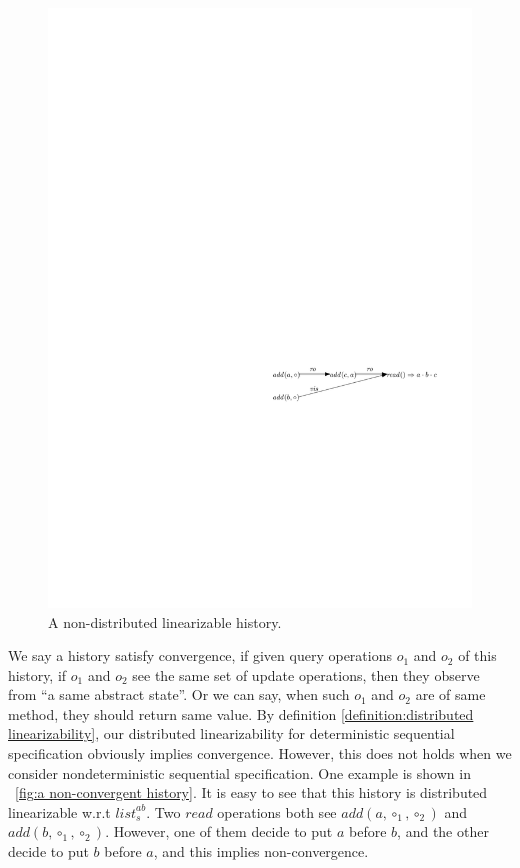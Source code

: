 \begin{figure}[t]
  \centering
  \includegraphics[width=0.6 \textwidth]{figures/PIC-Example-NonLinHis.pdf}
  \caption{A non-distributed linearizable history.}
  \label{fig:a non-distributed linearizable history}
\end{figure}

We say a history satisfy convergence, if given query operations $o_1$ and $o_2$ of this history, if $o_1$ and $o_2$ see the same set of update operations, then they observe from ``a same abstract state''. Or we can say, when such $o_1$ and $o_2$ are of same method, they should return same value. By definition \ref{definition:distributed linearizability}, our distributed linearizability for deterministic sequential specification obviously implies convergence. However, this does not holds when we consider nondeterministic sequential specification. One example is shown in \figurename~\ref{fig:a non-convergent history}. It is easy to see that this history is distributed linearizable w.r.t $\mathit{list}_s^{\mathit{ab}}$. Two $\mathit{read}$ operations both see $\mathit{add}(a,\circ_1,\circ_2)$ and $\mathit{add}(b,\circ_1,\circ_2)$. However, one of them decide to put $a$ before $b$, and the other decide to put $b$ before $a$, and this implies non-convergence.


